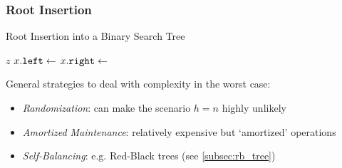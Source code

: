 \subsubsection{Root Insertion}
\label{subsubsec:bst_root_insert}
\begin{algorithm}[htb]
  \caption{Root Insertion into a Binary Search Tree}
  \label{alg:bst_root_insert}
  \begin{algorithmic}[1]
        \State \Return $z$
      \EndIf
        \State $x\mathtt{.}\mathtt{left}\gets$ 
        \State \Return {}
      \Else
        \State $x\mathtt{.}\mathtt{right}\gets$ 
        \State \Return {}
      \EndIf
    \EndFunction
  \end{algorithmic}
\end{algorithm}


General strategies to deal with complexity in the worst case:
\begin{itemize}[before={\parskip=0pt},nosep]
  \item \emph{Randomization}: can make the scenario $h = n$ highly unlikely
  \item \emph{Amortized Maintenance}: relatively expensive but `amortized' operations
  \item \emph{Self-Balancing}: e.g. Red-Black trees (see \ref{subsec:rb_tree})
\end{itemize}



